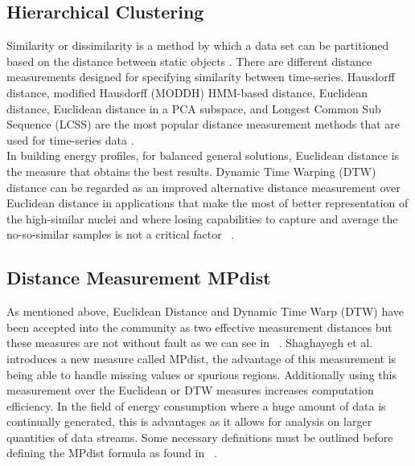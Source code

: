 \subsection{Hierarchical Clustering}
Similarity or dissimilarity is a method by which a data set can be partitioned based on the distance between static objects . There are different distance measurements designed for specifying similarity between time-series. Hausdorff distance, modified Hausdorff (MODDH) HMM-based distance, Euclidean distance, Euclidean distance in a PCA subspace, and Longest Common Sub Sequence (LCSS) are the most popular distance measurement methods that are used for time-series data \cite{AGHABOZORGI201516}.\\
In building energy profiles, for balanced general solutions, Euclidean distance is the measure that obtains the best results. Dynamic Time Warping (DTW) distance can be regarded as an improved alternative distance measurement over Euclidean distance in applications that make the most of better representation of the high-similar nuclei and where losing capabilities to capture and average the no-so-similar samples is not a critical factor ~\cite{8581840920130201}.\\

\subsection{Distance Measurement MPdist}
As mentioned above, Euclidean Distance and Dynamic Time Warp (DTW) have been accepted into the community as two effective measurement distances but these measures are not without fault as we can see in ~\cite{Gharghabi2018AnUT}. Shaghayegh et al. introduces a new measure called MPdist, the advantage of this measurement is being able to handle missing values or spurious regions. Additionally using this measurement over the Euclidean or DTW measures increases computation efficiency. In the field of energy consumption where a huge amount of data is continually generated, this is advantages as it allows for analysis on larger quantities of data streams. Some necessary definitions must be outlined before defining the MPdist formula as found in ~\cite{Gharghabi2018AnUT}.\\


